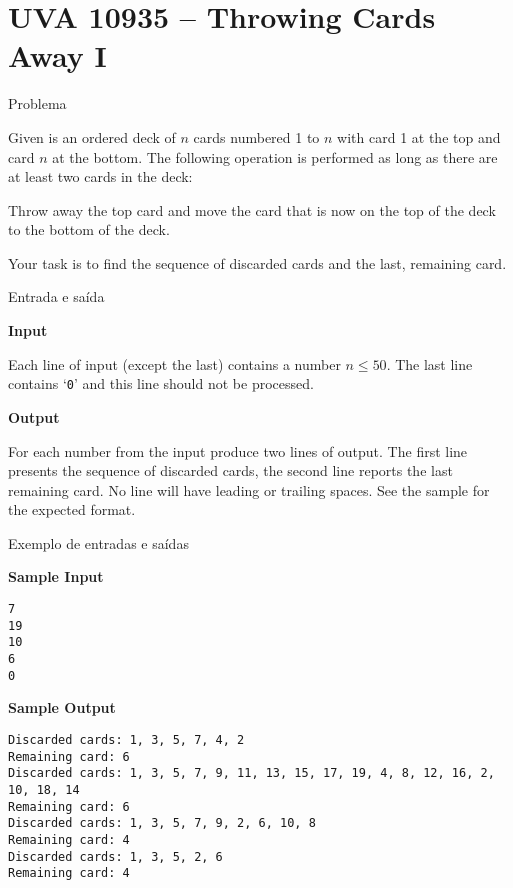 \section{UVA 10935 -- Throwing Cards Away I}

\begin{frame}[fragile]{Problema}

Given is an ordered deck of $n$ cards numbered 1 to
$n$ with card 1 at the top and card $n$ at the bottom.
The following operation is performed as long as there
are at least two cards in the deck:

\begin{center}
Throw away the top card and move the
card that is now on the top of the deck to
the bottom of the deck.
\end{center}

Your task is to find the sequence of discarded
cards and the last, remaining card.

\end{frame}

\begin{frame}[fragile]{Entrada e saída}

\textbf{Input}

Each line of input (except the last) contains a number
$n\leq 50$. The last line contains ‘\texttt{0}’ and this line should
not be processed.

\textbf{Output}

For each number from the input produce two lines of
output. The first line presents the sequence of discarded cards, the second line reports the last remaining card. No line will have leading or trailing spaces.
See the sample for the expected format.
\end{frame}

\begin{frame}[fragile]{Exemplo de entradas e saídas}

\begin{footnotesize}
\textbf{Sample Input}
\begin{verbatim}
7
19
10
6
0
\end{verbatim}

\textbf{Sample Output}
\begin{verbatim}
Discarded cards: 1, 3, 5, 7, 4, 2
Remaining card: 6
Discarded cards: 1, 3, 5, 7, 9, 11, 13, 15, 17, 19, 4, 8, 12, 16, 2, 10, 18, 14
Remaining card: 6
Discarded cards: 1, 3, 5, 7, 9, 2, 6, 10, 8
Remaining card: 4
Discarded cards: 1, 3, 5, 2, 6
Remaining card: 4
\end{verbatim}
\end{footnotesize}

\end{frame}

